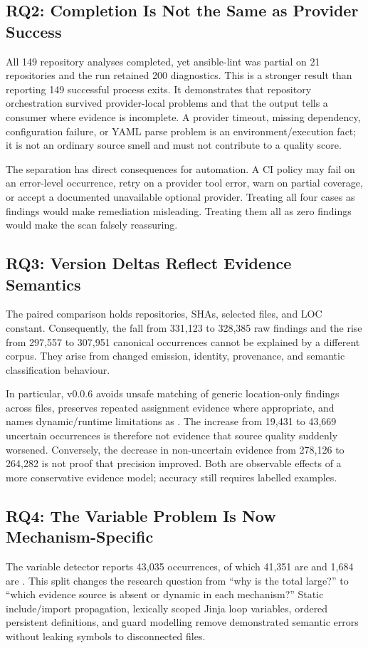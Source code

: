 \subsection{RQ2: Completion Is Not the Same as Provider Success}
All 149 repository analyses completed, yet ansible-lint was partial on 21
repositories and the run retained 200 diagnostics. This is a stronger result
than reporting 149 successful process exits. It demonstrates that repository
orchestration survived provider-local problems and that the output tells a
consumer where evidence is incomplete. A provider timeout, missing dependency,
configuration failure, or YAML parse problem is an environment/execution fact;
it is not an ordinary source smell and must not contribute to a quality score.

The separation has direct consequences for automation. A CI policy may fail on
an error-level occurrence, retry on a provider tool error, warn on partial
coverage, or accept a documented unavailable optional provider. Treating all
four cases as findings would make remediation misleading. Treating them all as
zero findings would make the scan falsely reassuring.

\subsection{RQ3: Version Deltas Reflect Evidence Semantics}
The paired comparison holds repositories, SHAs, selected files, and LOC
constant. Consequently, the fall from 331,123 to 328,385 raw findings and the
rise from 297,557 to 307,951 canonical occurrences cannot be explained by a
different corpus. They arise from changed emission, identity, provenance, and
semantic classification behaviour.

In particular, v0.0.6 avoids unsafe matching of generic location-only findings
across files, preserves repeated assignment evidence where appropriate, and
names dynamic/runtime limitations as . The increase from
19,431 to 43,669 uncertain occurrences is therefore not evidence that source
quality suddenly worsened. Conversely, the decrease in non-uncertain evidence
from 278,126 to 264,282 is not proof that precision improved. Both are
observable effects of a more conservative evidence model; accuracy still
requires labelled examples.

\subsection{RQ4: The Variable Problem Is Now Mechanism-Specific}
The variable detector reports 43,035 occurrences, of which 41,351 are
 and 1,684 are . This split changes the
research question from ``why is the total large?'' to ``which evidence source
is absent or dynamic in each mechanism?'' Static include/import propagation,
lexically scoped Jinja loop variables, ordered persistent definitions, and
guard modelling remove demonstrated semantic errors without leaking symbols
to disconnected files.

